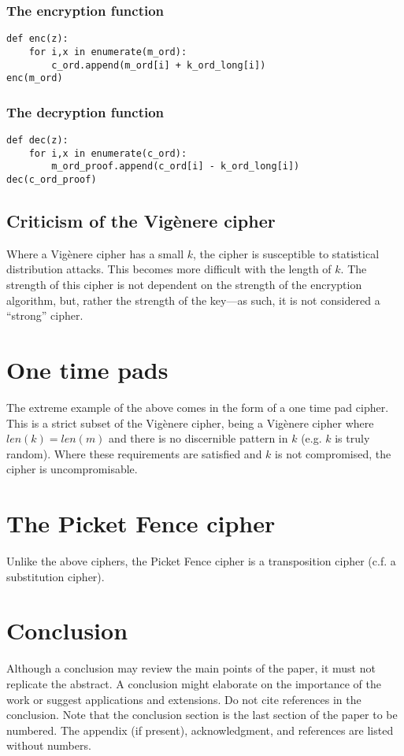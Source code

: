 \documentclass{AIAA}
\begin{document}
\subsubsection{The encryption function}

\begin{verbatim}
def enc(z):
    for i,x in enumerate(m_ord):
        c_ord.append(m_ord[i] + k_ord_long[i])
enc(m_ord)
\end{verbatim}

\subsubsection{The decryption function}

\begin{verbatim}
def dec(z):
    for i,x in enumerate(c_ord):
        m_ord_proof.append(c_ord[i] - k_ord_long[i])
dec(c_ord_proof)
\end{verbatim}

\subsection{Criticism of the Vig\`enere cipher}
Where a Vig\`enere cipher has a small $k$, the cipher is susceptible to statistical distribution attacks. This becomes more difficult with the length of $k$. The strength of this cipher is not dependent on the strength of the encryption algorithm, but, rather the strength of the key---as such, it is not considered a ``strong'' cipher.

\section{One time pads}
The extreme example of the above comes in the form of a one time pad cipher. This is a strict subset of the Vig\`enere cipher, being a Vig\`enere cipher where $len(k) = len(m)$ and there is no discernible pattern in $k$ (e.g. $k$ is truly random). Where these requirements are satisfied and $k$ is not compromised, the cipher is uncompromisable.

\section{The Picket Fence cipher}
Unlike the above ciphers, the Picket Fence cipher is a transposition cipher (c.f. a substitution cipher).




\section{Conclusion}
Although a conclusion may review the main points of the paper, it must not replicate the abstract. A conclusion might elaborate on the importance of the work or suggest applications and extensions. Do not cite references in the conclusion. Note that the conclusion section is the last section of the paper to be numbered. The appendix (if present), acknowledgment, and references are listed without numbers.
\end{document}
